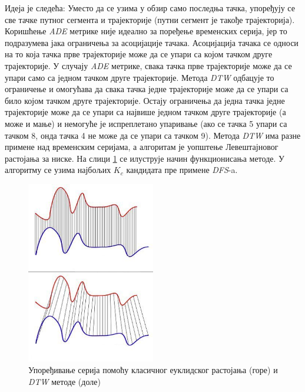 \documentclass[11pt,oneside]{memoir}
\begin{document}
Идеја је следећа: Уместо да се узима у обзир само последња тачка, упоређују се све тачке путног сегмента и трајекторије 
(путни сегмент је такође трајекторија). Коришћење \textit{ADE} метрике није идеално за поређење временских серија, јер 
то подразумева јака ограничења за асоцијације тачака. Асоцијација тачака се односи на то која тачка прве трајекторије може 
да се упари са којом тачком друге трајекторије. У случају \textit{ADE} метрике, свака тачка прве трајекторије
може да се упари само са једном тачком друге трајекторије. Метода \textit{DTW} одбацује то ограничење и омогућава
да свака тачка једне трајекторије може да се упари са било којом тачком друге трајекторије. Остају ограничења да једна
тачка једне трајекторије може да се упари са највише једном тачком друге трајекторије (а може и мање) и 
немогуће је испреплетано упаривање (ако се тачка 5 упари са тачком 8, онда тачка 4 не може да се упари са тачком 9). Метода
\textit{DTW} има разне примене над временским серијама, а алгоритам је уопштење Левештајновог растојања за ниске. На слици
\ref{euclidean_vs_dtw} се илуструје начин функционисања методе. У алгоритму се узима најбољих $K_c$ кандидата пре примене 
\textit{DFS}-a.

\begin{figure}[H]
  \centering
  \includegraphics[width=0.5\textwidth]{images/Euclidean_vs_DTW.jpg}
  \caption{Упоређивање серија помоћу класичног еуклидског растојања (горе) и \textit{DTW} методе (доле)}
  \label{euclidean_vs_dtw}
\end{figure}
\end{document}
